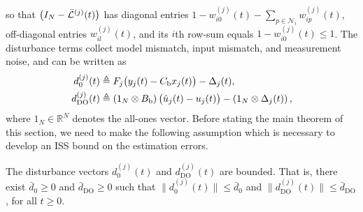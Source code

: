so that $\big(I_N-\bar{\mathcal{L}}^{(j)}(t)\big)$ has diagonal entries $1-w_{i0}^{(j)}(t)-\sum_{p\in\mathcal{N}_i} w_{ip}^{(j)}(t)$, off-diagonal entries $w_{il}^{(j)}(t)$, and its $i$th row-sum equals $1-w_{i0}^{(j)}(t)\le 1$.
The disturbance terms collect model mismatch, input mismatch, and measurement noise, and can be written as
\begin{align}\label{eq:def_disturbances}
d_0^{(j)}(t) &\triangleq F_j\big(y_j(t)-C_{\text{b}}x_j(t)\big)-\Delta_j(t), \notag\\
d_{\mathrm{DO}}^{(j)}(t) &\triangleq \left(1_N\otimes B_{\text{b}}\right)\big(\hat{u}_j(t)-u_j(t)\big)-\left(1_N\otimes \Delta_j(t)\right),
\end{align}
where $1_N\in\mathbb{R}^N$ denotes the all-ones vector.
Before stating the main theorem of this section, we need to make the following assumption which is necessary to develop an ISS bound on the estimation errors.
\begin{assumption}\label{assum_distur}
The disturbance vectors $d_0^{(j)}(t)$ and $d_{\mathrm{DO}}^{(j)}(t)$ are bounded. That is, there exist $\bar{d}_{0} \geq 0$ and $\bar{d}_{\mathrm{DO}} \geq 0$ such that
$\|d_0^{(j)}(t)\| \le \bar{d}_{0}$ and $\| d_{\mathrm{DO}}^{(j)}(t) \| \le \bar{d}_{\mathrm{DO}}$, for all $t\geq 0$.
\end{assumption}

